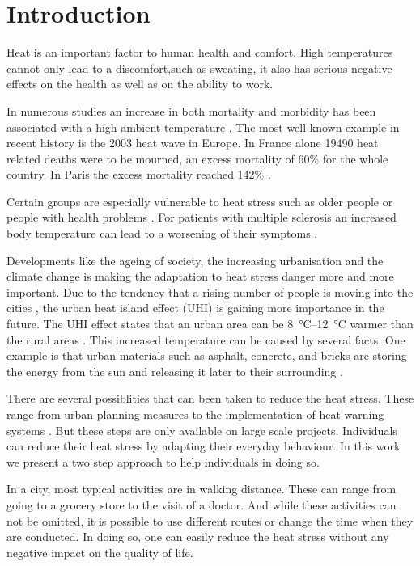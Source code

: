 
\section{Introduction}

Heat is an important factor to human health and comfort. High temperatures cannot only lead to a discomfort,such as sweating, it also has serious negative effects on the health as well as on the ability to work. 

In numerous studies an increase in both mortality and
morbidity has been associated with a high ambient temperature \parencite{Basu2009}. The most well known example in recent history is the 2003 heat wave in Europe. In France alone 19490 heat related deaths were to be mourned, an excess
mortality of 60\% for the whole country. In Paris the excess mortality reached 
142\% \parencite{Trobine2008death}. 

Certain groups are especially vulnerable to heat stress such as older people or people with health problems \parencite{Ebi2004,Huebler2007}. For patients with multiple sclerosis an increased body temperature can lead to a worsening of their symptoms \parencite{Davis2010}.

Developments like the ageing of society, the increasing urbanisation and the climate change is making the adaptation to heat stress danger more and more important. Due to the tendency that a rising number of people is moving into the cities \parencite{department2014world}, the urban heat island effect (UHI) is gaining more importance in the future. The UHI effect states that an urban area can be  \SIrange{8}{12}{\celsius} warmer than the rural areas \parencite{Prashad2014}. This increased temperature can be caused by several facts. One example is that urban materials such as asphalt, concrete, and bricks are storing the energy from the sun and releasing it later to their surrounding \parencite{Prashad2014}. 

There are several possiblities that can been taken to reduce the heat stress. These range from urban planning measures to the implementation of heat warning systems \parencite{Ebi2004}. But these steps are only available on large scale projects. Individuals can reduce their heat stress by adapting their everyday behaviour. In this work we present a two step approach to help individuals in doing so.

In a city, most typical activities are in walking distance. These can range from going to a grocery store to the visit of a doctor. And while these activities can not be omitted, it is possible to use different routes or change the time when they are conducted. In doing so, one can easily reduce the heat stress without any negative impact on the quality of life. 

